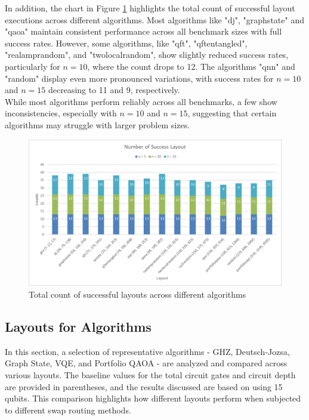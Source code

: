 In addition, the chart in Figure \ref{fig:chart-success-layout-run} highlights the total count of successful layout executions across different algorithms. Most algorithms like "dj", "graphstate" and "qaoa" maintain consistent performance across all benchmark sizes with full success rates. However, some algorithms, like "qft", "qftentangled", "realamprandom", and "twolocalrandom", show slightly reduced success rates, particularly for $n = 10$, where the count drops to 12. The algorithms "qnn" and "random" display even more pronounced variations, with success rates for $n = 10$ and $n = 15$ decreasing to 11 and 9, respectively. \\
While most algorithms perform reliably across all benchmarks, a few show inconsistencies, especially with $n = 10$ and $n = 15$, suggesting that certain algorithms may struggle with larger problem sizes.
\begin{figure}[htb]
    \centering
    \includegraphics[width=0.8\linewidth]{image/chart_success_layout_run.png}
    \caption{Total count of successful layouts across different algorithms}
    \label{fig:chart-success-layout-run}
\end{figure}
\subsection{Layouts for Algorithms}
In this section, a selection of representative algorithms - GHZ, Deutsch-Jozsa, Graph State, VQE, and Portfolio QAOA - are analyzed and compared across various layouts. The baseline values for the total circuit gates and circuit depth are provided in parentheses, and the results discussed are based on using 15 qubits. This comparison highlights how different layouts perform when subjected to different swap routing methods.

